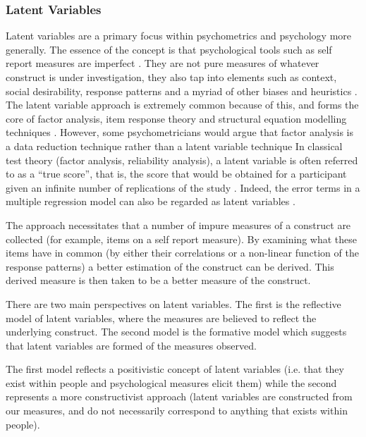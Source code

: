 \subsubsection{Latent Variables}

Latent variables are a primary focus within psychometrics and psychology more generally\cite{bollen2002latent}\cite{borsboom2006attack}. The essence of the concept is that psychological tools such as self report measures are imperfect \cite{edwards2000nature}. They are not pure measures of whatever construct is under investigation, they also tap into elements such as context, social desirability, response patterns and a myriad of other biases and heuristics \cite{borsboom2006attack}. The latent variable approach is extremely common because of this, and forms the core of factor analysis, item response theory and structural equation modelling techniques \cite{bollen2002latent}. However, some psychometricians would argue that factor analysis is a data reduction technique rather than a latent variable technique \cite{borsboom2006attack} In classical test theory (factor analysis, reliability analysis), a latent variable is often referred to as a ``true score'', that is, the score that would be obtained for a participant given an infinite number of replications of the study \cite{bollen2002latent,edwards2000nature}. Indeed, the error terms in a multiple regression model can also be regarded as latent variables \cite{bollen2002latent}.

 The approach necessitates that a number of impure measures of a construct are collected (for example, items on a self report measure)\cite{edwards2000nature}. By examining what these items have in common (by either their correlations or a non-linear function of the response patterns) a better estimation of the construct can be derived\cite{borsboom2006attack}. This derived measure is then taken to be a better measure of the construct. 

There are two main perspectives on latent variables. The first is the reflective model of latent variables, where the measures are believed to reflect the underlying construct. The second model is the formative model which suggests that latent variables are formed of the measures observed\cite{bollen2002latent,edwards2000nature}. 

The first model reflects a positivistic concept of latent variables (i.e. that they exist within people and psychological measures elicit them) while the second represents a more constructivist approach (latent variables are constructed from our measures, and do not necessarily correspond to anything that exists within people). 

